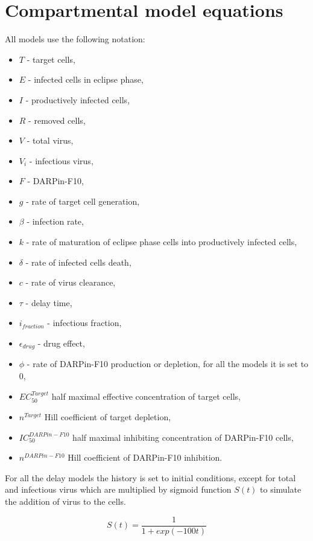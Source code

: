 \section{Compartmental model equations}
\label{appendix:compartmentalModelEquations}

All models use the following notation:

\begin{itemize}
\item $T$ - target cells,
\item $E$ - infected cells in eclipse phase,
\item $I$ - productively infected cells,
\item $R$ - removed cells,
\item $V$ - total virus,
\item $V_i$ - infectious virus,
\item $F$ - DARPin-F10,
\item $g$ - rate of target cell generation,
\item $\beta$ - infection rate,
\item $k$ - rate of maturation of eclipse phase cells into productively infected cells,
\item $\delta$ - rate of infected cells death,
\item $c$ - rate of virus clearance,
\item $\tau$ - delay time,
\item $i_{fraction}$ - infectious fraction,
\item $\epsilon_{drug}$ - drug effect,
\item $\phi$ - rate of DARPin-F10 production or depletion, for all the models it is set to 0,
\item $EC_{50}^{Target}$ half maximal effective concentration of target cells,
\item $n^{Target}$ Hill coefficient of target depletion,
\item $IC_{50}^{DARPin-F10}$ half maximal inhibiting concentration of DARPin-F10 cells,
\item $n^{DARPin-F10}$ Hill coefficient of DARPin-F10 inhibition.
\end{itemize}

For all the delay models the history is set to initial conditions, except for total and infectious virus which are multiplied by sigmoid function $S(t)$ to simulate the addition of virus to the cells.

\begin{equation}
S(t) = \frac{1}{1 + exp(-100t)}
\end{equation}

